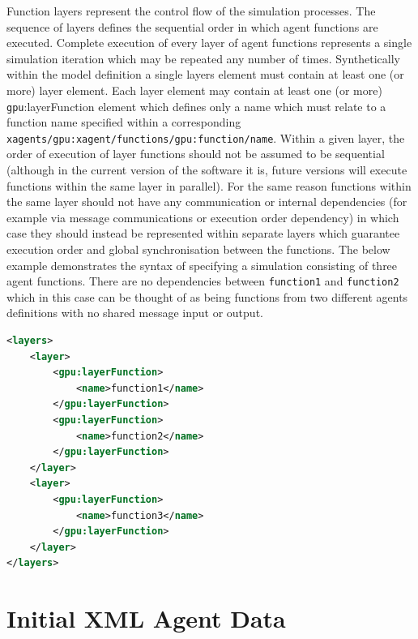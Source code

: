\documentclass[11pt, a4paper, onecolumn, oneside]{report}
\begin{document}
Function layers represent the control flow of the simulation processes.
The sequence of layers defines the sequential order in which agent functions are executed.
Complete execution of every layer of agent functions represents a single simulation iteration which may be repeated any number of times.
Synthetically within the model definition a single layers element must contain at least one (or more) layer element.
Each layer element may contain at least one (or more) \texttt{gpu}:layerFunction element which defines only a name which must relate to a function name specified within a corresponding \texttt{xagents/gpu:xagent/functions/gpu:function/name}.
Within a given layer, the order of execution of layer functions should not be assumed to be sequential (although in the current version of the software it is, future versions will execute functions within the same layer in parallel).
For the same reason functions within the same layer should not have any communication or internal dependencies (for example via message communications or execution order dependency) in which case they should instead be represented within separate layers which guarantee execution order and global synchronisation between the functions.
The below example demonstrates the syntax of specifying a simulation consisting of three agent functions.
There are no dependencies between \verb|function1| and \verb|function2| which in this case can be thought of as being functions from two different agents definitions with no shared message input or output.


\begin{lstlisting}[language=XML]
<layers>
    <layer>
        <gpu:layerFunction>
            <name>function1</name>
        </gpu:layerFunction>
        <gpu:layerFunction>
            <name>function2</name>
        </gpu:layerFunction>
    </layer>
    <layer>
        <gpu:layerFunction>
            <name>function3</name>
        </gpu:layerFunction>
    </layer>
</layers>
\end{lstlisting}


\section{Initial XML Agent Data}
\label{sec:27}
\end{document}
